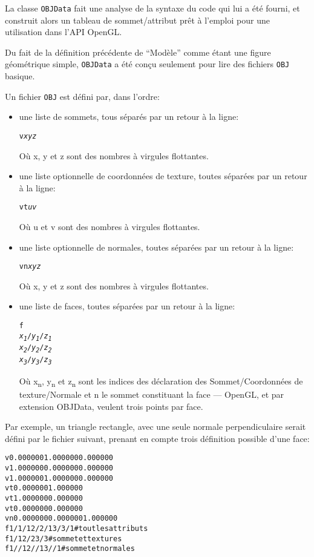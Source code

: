 \documentclass[pdftex, 11pt, a4paper, titlepage]{article}
\begin{document}
La classe \texttt{OBJData} fait une analyse de la syntaxe du code qui
lui a été fourni, et construit alors un tableau de sommet/attribut
prêt à l'emploi pour une utilisation dans l'API OpenGL.

Du fait de la définition précédente de ``Modèle'' comme étant une
figure géométrique simple, \texttt{OBJData} a été conçu seulement pour
lire des fichiers \texttt{OBJ} basique.

Un fichier \texttt{OBJ} est défini par, dans l'ordre:
\begin{itemize}

\item une liste de sommets, tous séparés par un retour à la ligne:
  \begin{alltt}
    v \emph{x} \emph{y} \emph{z}
  \end{alltt}
  Où x, y et z sont des nombres à virgules flottantes.

\item une liste optionnelle de coordonnées de texture, toutes séparées
  par un retour à la ligne:
  \begin{alltt}
    vt \emph{u} \emph{v}
  \end{alltt}
  Où u et v sont des nombres à virgules flottantes.

\item une liste optionnelle de normales, toutes séparées par un retour
  à la ligne:
  \begin{alltt}
    vn \emph{x} \emph{y} \emph{z}
  \end{alltt}
  Où x, y et z sont des nombres à virgules flottantes.

\item une liste de faces, toutes séparées par un retour à la ligne:
  \begin{alltt}
    f
    \emph{x\textsubscript{1}}/\emph{y\textsubscript{1}}/\emph{z\textsubscript{1}}
    \emph{x\textsubscript{2}}/\emph{y\textsubscript{2}}/\emph{z\textsubscript{2}}
    \emph{x\textsubscript{3}}/\emph{y\textsubscript{3}}/\emph{z\textsubscript{3}}
  \end{alltt}
  Où x\textsubscript{n}, y\textsubscript{n} et z\textsubscript{n} sont
  les indices des déclaration des Sommet/Coordonnées de
  texture/Normale et n
  le sommet constituant la face --- OpenGL, et par extension OBJData, veulent
trois points par face.
\end{itemize}

Par exemple, un triangle rectangle, avec une seule normale
perpendiculaire serait défini par le fichier suivant, prenant en
compte trois définition possible d'une face:
\begin{alltt}
v 0.000000 1.000000 0.000000 
v 1.000000 0.000000 0.000000
v 1.000000 1.000000 0.000000
vt 0.000000 1.000000
vt 1.000000 0.000000
vt 0.000000 0.000000 
vn 0.000000 0.000000 1.000000
f 1/1/1 2/2/1 3/3/1 # tout les attributs 
f 1/1 2/2 3/3       # sommet et textures
f 1//1 2//1 3//1    # sommet et normales
\end{alltt}
\end{document}
